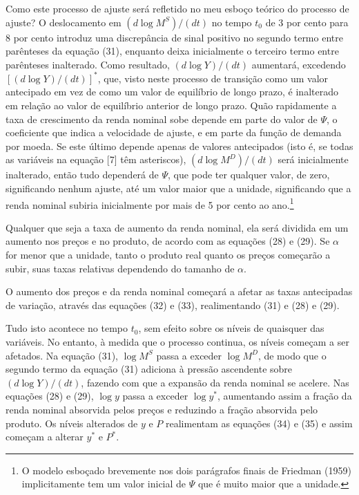 \documentclass[12pt]{article}
\begin{document}
Como este processo de ajuste será refletido no meu esboço teórico do processo de ajuste? O deslocamento em $(d \log M^S)/(dt)$ no tempo $t_0$ de 3 por cento para 8 por cento introduz uma discrepância de sinal positivo no segundo termo entre parênteses da equação (31), enquanto deixa inicialmente o terceiro termo entre parênteses inalterado. Como resultado, $(d \log Y)/(dt)$ aumentará, excedendo $[(d \log Y)/(dt)]^*$, que, visto neste processo de transição como um valor antecipado em vez de como um valor de equilíbrio de longo prazo, é inalterado em relação ao valor de equilíbrio anterior de longo prazo. Quão rapidamente a taxa de crescimento da renda nominal sobe depende em parte do valor de $\Psi$, o coeficiente que indica a velocidade de ajuste, e em parte da função de demanda por moeda. Se este último depende apenas de valores antecipados (isto é, se todas as variáveis na equação [7] têm asteriscos), $(d \log M^D)/(dt)$ será inicialmente inalterado, então tudo dependerá de $\Psi$, que pode ter qualquer valor, de zero, significando nenhum ajuste, até um valor maior que a unidade, significando que a renda nominal subiria inicialmente por mais de 5 por cento ao ano.\footnote{O modelo esboçado brevemente nos dois parágrafos finais de Friedman (1959) implicitamente tem um valor inicial de $\Psi$ que é muito maior que a unidade.}

Qualquer que seja a taxa de aumento da renda nominal, ela será dividida em um aumento nos preços e no produto, de acordo com as equações (28) e (29). Se $\alpha$ for menor que a unidade, tanto o produto real quanto os preços começarão a subir, suas taxas relativas dependendo do tamanho de $\alpha$.

O aumento dos preços e da renda nominal começará a afetar as taxas antecipadas de variação, através das equações (32) e (33), realimentando (31) e (28) e (29).

Tudo isto acontece no tempo $t_0$, sem efeito sobre os níveis de quaisquer das variáveis. No entanto, à medida que o processo continua, os níveis começam a ser afetados. Na equação (31), $\log M^S$ passa a exceder $\log M^D$, de modo que o segundo termo da equação (31) adiciona à pressão ascendente sobre $(d \log Y)/(dt)$, fazendo com que a expansão da renda nominal se acelere. Nas equações (28) e (29), $\log y$ passa a exceder $\log y^*$, aumentando assim a fração da renda nominal absorvida pelos preços e reduzindo a fração absorvida pelo produto. Os níveis alterados de $y$ e $P$ realimentam as equações (34) e (35) e assim começam a alterar $y^*$ e $P^*$.
\end{document}

